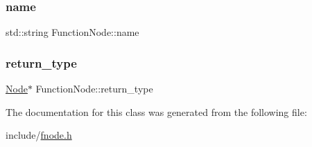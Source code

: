 \mbox{\label{classFunctionNode_a21284dd655c91da1f792dc3bc1bba60c}} 
\subsubsection{\texorpdfstring{name}{name}}
{\footnotesize\ttfamily std\+::string Function\+Node\+::name}

\mbox{\label{classFunctionNode_a52768e57ce61d19f974c5c7412168377}} 
\subsubsection{\texorpdfstring{return\+\_\+type}{return\_type}}
{\footnotesize\ttfamily \hyperlink{classNode}{Node}$\ast$ Function\+Node\+::return\+\_\+type}



The documentation for this class was generated from the following file\+:\begin{DoxyCompactItemize}
\item 
include/\hyperlink{fnode_8h}{fnode.\+h}\end{DoxyCompactItemize}
